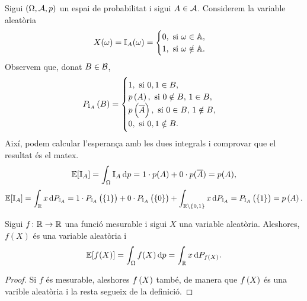 \begin{example}
    Sigui $\left( \Omega, \mathcal{A}, p\right)$ un espai de probabilitat i sigui $A\in\mathcal{A}$. Considerem la variable aleatòria
    \[
        X(\omega) = \mathbb{I}_A(\omega) = \begin{cases}
        0,\text{ si } \omega\in \mathbb{A}, \\ 1,\text{ si } \omega \notin \mathbb{A}.
        \end{cases}
    \]
    Observem que, donat $B\in\mathcal{B}$,
    \[
        P_{\mathbb{I}_A}\left( B\right) = \begin{cases}
            1, \text{ si } 0,1\in B,\\
            p\left( A\right), \text{ si } 0\notin B,\, 1\in B,\\
            p\left( \overline{A}\right), \text{ si } 0\in B,\, 1\notin B,\\
            0, \text{ si } 0,1\notin B.
        \end{cases}
    \]
    Així, podem calcular l'esperança amb les dues integrals i comprovar que el resultat és el matex.
    \[
        \esp[\mathbb{I}_A] = \int_\Omega{\mathbb{I}_A \dif p} = 1\cdot p(A) + 0\cdot p(\comp{A}) = p(A),
    \]
    \[
        \esp[\mathbb{I}_A] = \int_\real{x\dif P_{\mathbb{I}_A}} = 1\cdot P_{\mathbb{I}_A}\lp\lc 1\rc\rp + 0\cdot P_{\mathbb{I}_A}\lp\lc 0\rc\rp+ \int_{\real\setminus\lc 0,1\rc} x\dif P_{\mathbb{I}_A} = P_{\mathbb{I}_A}\lp\lc 1\rc\rp = p\lp A\rp.
    \]
\end{example}


\begin{prop}
    Sigui $f\colon\mathbb{R}\to\mathbb{R}$ una funció mesurable i sigui $X$ una variable aleatòria. Aleshores, $f(X)$ és una variable aleatòria i
    \[
        \esp[f(X)] = \int_{\Omega}{f(X) \dif p} = \int_\real{x \dif P_{f\lp X\rp}}.
    \]
\end{prop}
\begin{proof}
    Si $f$ és mesurable, aleshores $f\left( X\right)$ també, de manera que $f\left( X\right)$ és una varible aleatòria i la resta segueix de la definició.
\end{proof}

